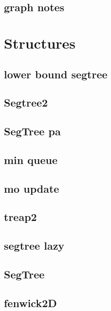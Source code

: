 \subsection{graph notes}
\raggedbottom
\hrulefill

\section{Structures}
\subsection{lower bound segtree}
\raggedbottom
\hrulefill
\subsection{Segtree2}
\raggedbottom
\hrulefill
\subsection{SegTree pa}
\raggedbottom
\hrulefill
\subsection{min queue}
\raggedbottom
\hrulefill
\subsection{mo update}
\raggedbottom
\hrulefill
\subsection{treap2}
\raggedbottom
\hrulefill
\subsection{segtree lazy}
\raggedbottom
\hrulefill
\subsection{SegTree}
\raggedbottom
\hrulefill
\subsection{fenwick2D}
\raggedbottom
\hrulefill
